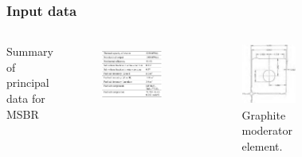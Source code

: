 \begin{frame}
  \frametitle{Input data}
  \begin{columns}
    \column[t]{6cm}
     \begin{table}[h!]
           \vspace*{-0.3in}
    \caption{Summary of principal data for \gls{MSBR} \cite{robertson_conceptual_1971}}
      \end{table}
    \begin{figure}[t]
      \vspace*{-0.45in}
            \includegraphics[height=0.55\textwidth]{./images/table_input.png}
    \end{figure}
    \begin{figure}[t]
                \vspace*{-0.2in}
                \includegraphics[height=0.55\textwidth]{./images/cell_geometry.png}
                \vspace*{-0.1in}
                \caption{Graphite moderator element.}
      \end{figure}
     \column[t]{5.6cm}
           \begin{figure}[t]

\end{figure}
\end{columns}
\end{frame}
